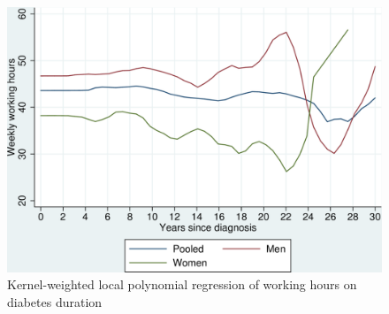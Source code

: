 \documentclass[12pt,english,british]{article}
\begin{document}
\begin{figure}[h!]
\begin{center}
\includegraphics[width=0.7\columnwidth]{figures/lpoly_workhrs_diabetesduration/lpoly_workhrs_diabetesduration}
\caption{\label{fig:Kernel-weighted-local-polynomial_workhrs}Kernel-weighted local
polynomial regression of working hours on diabetes duration}%
\end{center}
\end{figure}

\FloatBarrier
\end{document}
